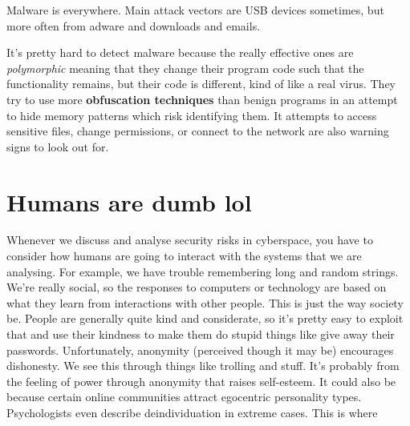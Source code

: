 \documentclass[11pt,a4paper,titlepage]{scrartcl}
\begin{document}
Malware is everywhere. Main attack vectors are USB devices sometimes, but
more often from adware and downloads and emails.

It's pretty hard to detect malware because the really effective ones are
\textit{polymorphic} meaning that they change their program code such that
the functionality remains, but their code is different, kind of like a
real virus. They try to use more \textbf{obfuscation techniques} than
benign programs in an attempt to hide memory patterns which risk
identifying them. It attempts to access sensitive files, change
permissions, or connect to the network are also warning signs to look out
for. 

\section{Humans are dumb lol}%
\label{sec:dumb-humans}

Whenever we discuss and analyse security risks in cyberspace, you have to
consider how humans are going to interact with the systems that we are
analysing. For example, we have trouble remembering long and random
strings. We're really social, so the responses to computers or technology
are based on what they learn from interactions with other people. This is
just the way society be. People are generally quite kind and considerate,
so it's pretty easy to exploit that and use their kindness to make them do
stupid things like give away their passwords. Unfortunately, anonymity
(perceived though it may be) encourages dishonesty. We see this through
things like trolling and stuff. It's probably from the feeling of power
through anonymity that raises self-esteem. It could also be because
certain online communities attract egocentric personality types.
Psychologists even describe deindividuation in extreme cases. This is
where 
\end{document}
